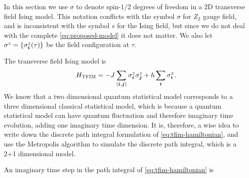 \documentclass[hyperref, a4paper]{article}
\newcommand*{\pair}[1]{\langle #1 \rangle}
\newcommand*{\Ztwo}{\texorpdfstring{$\mathbb{Z}_2$ }{Z2 }}
\newcommand*{\tfim}{transverse field Ising model}
\def\mathbb#1{#1}%
\begin{document}
In this section we use $\sigma$ to denote spin-$1/2$ degrees of freedom in a 2D \tfim.
This notation conflicts with the symbol $\sigma$ for \Ztwo gauge field, 
and is inconsistent with the symbol $s$ for the Ising field, 
but since we do not deal with the complete \eqref{eq:proposed-model} it does not matter.
We also let $\sigma^z = \{\sigma^z_{\vb*{i}}(\tau)\}$ be the field configuration at $\tau$.

The \tfim{} is 
\begin{equation}
    H_\text{TFIM} = - J \sum_{\pair{\vb*{i}, \vb*{j}}} \sigma^z_{\vb*{i}} \sigma^z_{\vb*{j}} + h \sum_{\vb*{i}} \sigma^x_{\vb*{i}}.
    \label{eq:tfim-hamiltonian}
\end{equation}
We know that a two dimensional quantum statistical model corresponds to a three dimensional classical statistical model, which is because a quantum statistical model can have quantum fluctuation and therefore imaginary time evolution, adding one imaginary time dimension.
It is, therefore, a wise idea to write down the discrete path integral formulation of \eqref{eq:tfim-hamiltonian}, and use the Metropolis algorithm to simulate the discrete path integral, which is a 2+1 dimensional model.

An imaginary time step in the path integral of \eqref{eq:tfim-hamiltonian} is 
\end{document}
